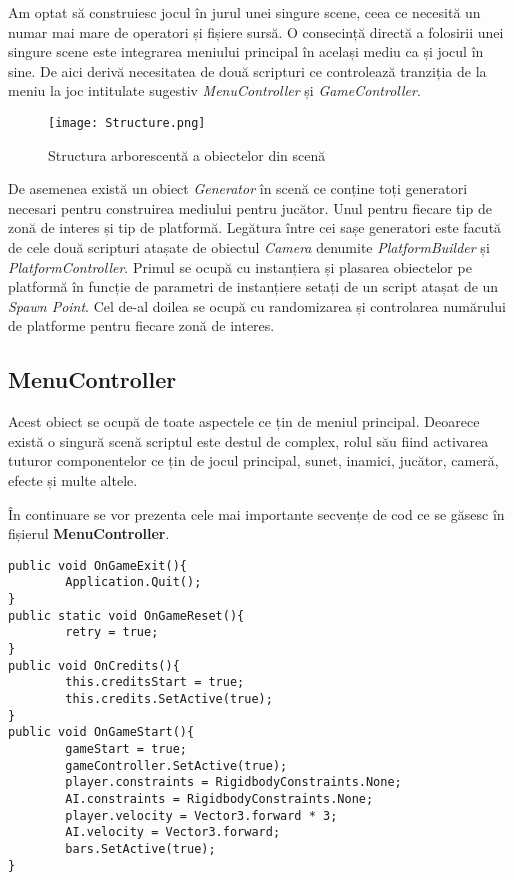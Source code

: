 Am optat să construiesc jocul în jurul unei singure scene, ceea ce necesită un numar mai mare de operatori și fișiere sursă. O consecință directă a folosirii unei singure scene este integrarea meniului principal în același mediu ca și jocul în sine. De aici derivă necesitatea de două scripturi ce controlează tranziția de la meniu la joc intitulate sugestiv \textit{MenuController} și \textit{GameController}.\par


\begin{figure}[H]
\centering
\texttt{[image: Structure.png]} \par
\caption{Structura arborescentă a obiectelor din scenă}
\end{figure}

De asemenea există un obiect \textit{Generator} în scenă ce conține toți generatori necesari pentru construirea mediului pentru jucător. Unul pentru fiecare tip de zonă de interes și tip de platformă. Legătura între cei sașe generatori este facută de cele două scripturi atașate de obiectul \textit{Camera} denumite \textit{PlatformBuilder} și \textit{PlatformController}. Primul se ocupă cu instanțiera și plasarea obiectelor pe platformă în funcție de parametri de instanțiere setați de un script atașat de un \textit{Spawn Point}. Cel de-al doilea se ocupă cu randomizarea și controlarea numărului de platforme pentru fiecare zonă de interes.\par
\par

\subsection{MenuController}

Acest obiect se ocupă de toate aspectele ce țin de meniul principal. Deoarece există o singură scenă scriptul este destul de complex, rolul său fiind activarea tuturor componentelor ce țin de jocul principal, sunet, inamici, jucător, cameră, efecte și multe altele.\par

În continuare se vor prezenta cele mai importante secvențe de cod ce se găsesc în fișierul \textbf{MenuController}.\par

\begin{lstlisting}[caption=Funcțiile din MenuController]
public void OnGameExit(){
        Application.Quit();
}
public static void OnGameReset(){
        retry = true;
}
public void OnCredits(){
        this.creditsStart = true;
        this.credits.SetActive(true);
}
public void OnGameStart(){
        gameStart = true;
        gameController.SetActive(true);
        player.constraints = RigidbodyConstraints.None;
        AI.constraints = RigidbodyConstraints.None;
        player.velocity = Vector3.forward * 3;
        AI.velocity = Vector3.forward;
        bars.SetActive(true);
}
\end{lstlisting}

